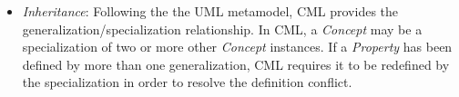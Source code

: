 \begin{itemize}
\item \emph{Inheritance}: Following the the UML \cite{uml} metamodel,
CML provides the generalization/specialization relationship.
In CML, a \emph{Concept} may be a specialization of two or more other \emph{Concept} instances.
If a \emph{Property} has been defined by more than one generalization,
CML requires it to be redefined by the specialization
in order to resolve the definition conflict.

\end{itemize}

